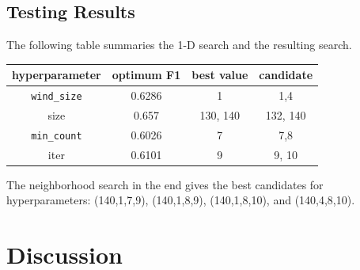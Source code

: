 \documentclass[11pt,a4paper]{article}
\begin{document}
\subsection{Testing Results}
The following table summaries the 1-D search and the resulting search. 
\begin{tabular}{|c|c|c|c|}
	\hline 
	hyperparameter & optimum F1 & best value & candidate \\
	\hline 
	\texttt{wind\_size} &  0.6286 & 1 & 1,4\\ 
	\hline 
	size & 0.657 & 130, 140  & 132, 140 \\
	\hline 
	\texttt{min\_count} & 0.6026 & 7 & 7,8 \\
	\hline 
	iter & 0.6101 & 9 & 9, 10 \\
	\hline 
\end{tabular}
The neighborhood search in the end gives the best candidates for hyperparameters: (140,1,7,9), (140,1,8,9), (140,1,8,10), and (140,4,8,10).

\section{Discussion}

	

%
%
%
%



\appendix


	
\end{document}
